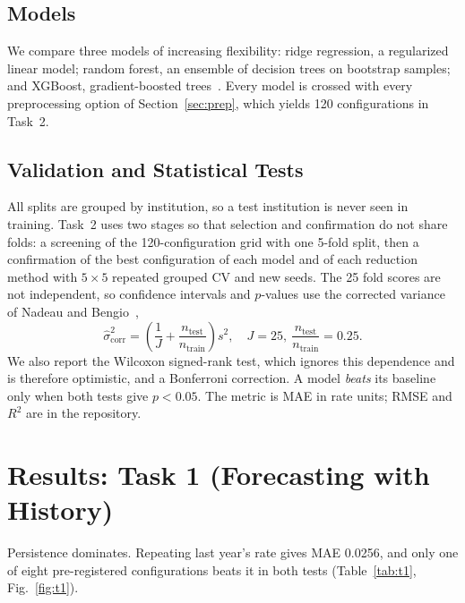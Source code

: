 \documentclass[conference]{IEEEtran}
\begin{document}
\subsection{Models}
We compare three models of increasing flexibility: ridge regression, a regularized linear model; random forest, an ensemble of decision trees on bootstrap samples; and XGBoost, gradient-boosted trees~\cite{pedregosa2011,chen2016}. Every model is crossed with every preprocessing option of Section~\ref{sec:prep}, which yields 120 configurations in Task~2.

\subsection{Validation and Statistical Tests}
All splits are grouped by institution, so a test institution is never seen in training. Task~2 uses two stages so that selection and confirmation do not share folds: a screening of the 120-configuration grid with one 5-fold split, then a confirmation of the best configuration of each model and of each reduction method with $5\times5$ repeated grouped CV and new seeds. The 25 fold scores are not independent, so confidence intervals and $p$-values use the corrected variance of Nadeau and Bengio~\cite{nadeau2003},
\begin{equation}
\hat{\sigma}^2_{\mathrm{corr}} = \left(\frac{1}{J} + \frac{n_{\mathrm{test}}}{n_{\mathrm{train}}}\right) s^2, \quad J=25,\ \frac{n_{\mathrm{test}}}{n_{\mathrm{train}}}=0.25.
\end{equation}
We also report the Wilcoxon signed-rank test, which ignores this dependence and is therefore optimistic, and a Bonferroni correction. A model \emph{beats} its baseline only when both tests give $p<0.05$. The metric is MAE in rate units; RMSE and $R^2$ are in the repository.

\section{Results: Task 1 (Forecasting with History)}

Persistence dominates. Repeating last year's rate gives MAE 0.0256, and only one of eight pre-registered configurations beats it in both tests (Table~\ref{tab:t1}, Fig.~\ref{fig:t1}).
\end{document}
